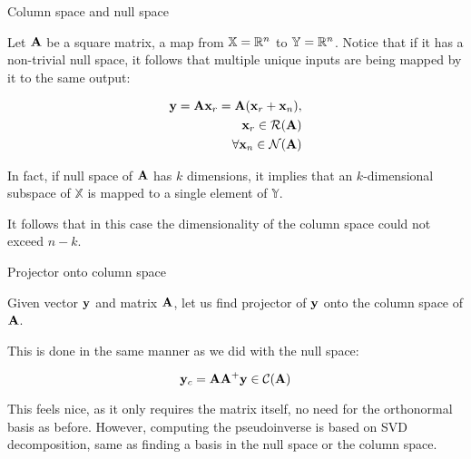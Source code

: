 \documentclass{beamer}
\begin{document}
\begin{frame}{Column space and null space}
	\begin{flushleft}
		
		Let $\mathbf{A}$ be a square matrix, a map from $\mathbb{X} = \mathbb{R}^n$ to $\mathbb{Y} = \mathbb{R}^n$. Notice that if it has a non-trivial null space, it follows that multiple unique inputs are being mapped by it to the same output:
		
		\begin{equation}
			\begin{aligned}
				\mathbf{y} = \mathbf{A} \mathbf{x}_r = \mathbf{A} (\mathbf{x}_r + \mathbf{x}_n), \\
				\mathbf{x}_r \in \mathcal{R}(\mathbf{A}) \\
				\forall \mathbf{x}_n \in \mathcal{N}(\mathbf{A}) \\
			\end{aligned}
		\end{equation}
		
		In fact, if null space of $\mathbf{A}$ has $k$ dimensions, it implies that an $k$-dimensional subspace of $\mathbb{X}$ is mapped to a single element of $\mathbb{Y}$. 
		
		\bigskip
		
		It follows that in this case the dimensionality of the column space could not exceed $n-k$.
		
	\end{flushleft}
\end{frame}



\begin{frame}{Projector onto column space}
	\begin{flushleft}
		
		Given vector $\mathbf{y}$ and matrix $\mathbf{A}$, let us find projector of $\mathbf{y}$ onto the column space of $\mathbf{A}$.
		
		\bigskip
		
		This is done in the same manner as we did with the null space:
		
		\begin{equation}
			\mathbf{y}_c = \mathbf{A}\mathbf{A}^+ \mathbf{y} \in \mathcal{C}(\mathbf{A})
		\end{equation}
		
		This feels nice, as it only requires the matrix itself, no need for the orthonormal basis as before. However, computing the pseudoinverse is based on SVD decomposition, same as finding a basis in the null space or the column space.
		
	\end{flushleft}
\end{frame}
\end{document}

